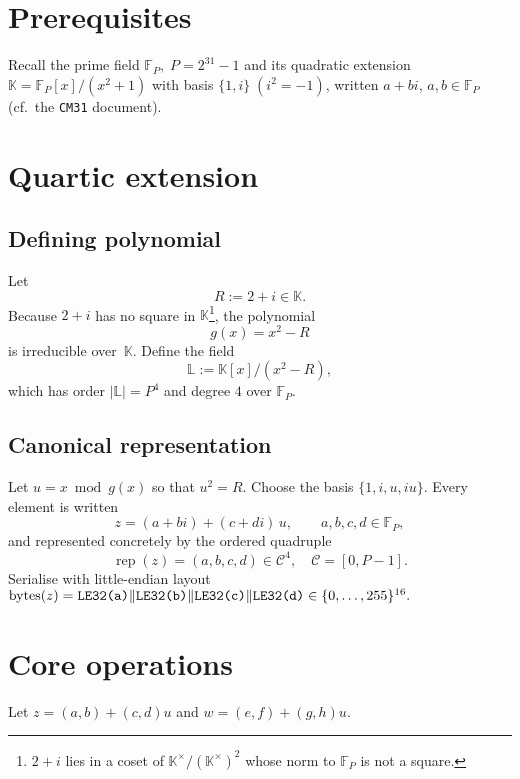 \documentclass{article}
\begin{document}
\section{Prerequisites}

Recall the prime field
\(
   \mathbb{F}_{P}, \; P=2^{31}-1
\)
and its quadratic extension
\(
   \mathbb{K}=\mathbb{F}_{P}[x]/(x^{2}+1)
\)
with basis \(\{1,i\}\;(i^{2}=-1)\), written
\(a+bi\), \(a,b\in\mathbb{F}_{P}\)
(cf.\ the \texttt{CM31} document).

\section{Quartic extension}

\subsection{Defining polynomial}

Let
\[
   R := 2 + i\in\mathbb{K}.
\]
Because \(2+i\) has no square in \(\mathbb{K}\)\footnote{%
\(2+i\) lies in a coset of \(\mathbb{K}^{\times}/(\mathbb{K}^{\times})^{2}\)
whose norm to \(\mathbb{F}_{P}\) is not a square.},
the polynomial
\[
   g(x)=x^{2}-R
\]
is irreducible over~\(\mathbb{K}\).
Define the field
\[
   \mathbb{L}:=\mathbb{K}[x]/(x^{2}-R),
\]
which has order
\(
   |\mathbb{L}| = P^{4}
\)
and degree \(4\) over \(\mathbb{F}_{P}\).

\subsection{Canonical representation}

Let \(u = x \bmod g(x)\) so that \(u^{2}=R\).
Choose the basis \(\{1,i,u,iu\}\).
Every element is written
\[
   z = (a+bi) + (c+di)\,u,
   \qquad a,b,c,d\in\mathbb{F}_{P},
\]
and represented concretely by the ordered quadruple
\[
   \operatorname{rep}(z) = (a,b,c,d)\in\mathcal{C}^{4},
   \quad \mathcal{C}=[0,P-1].
\]
Serialise with little-endian layout
\(
   \text{bytes}(z)=\verb|LE32(a)|\Vert\verb|LE32(b)|\Vert
                   \verb|LE32(c)|\Vert\verb|LE32(d)|\in\{0,\dots,255\}^{16}.
\)

\section{Core operations}

Let \(z=(a,b)+(c,d)u\) and \(w=(e,f)+(g,h)u\).
\end{document}
